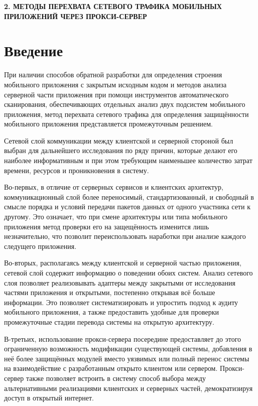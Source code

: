 \newpage
\begin{center}
  \textbf{\large 2. МЕТОДЫ ПЕРЕХВАТА СЕТЕВОГО ТРАФИКА МОБИЛЬНЫХ ПРИЛОЖЕНИЙ ЧЕРЕЗ ПРОКСИ-СЕРВЕР}
\end{center}


\section{Введение}

При наличии способов обратной разработки для определения строения мобильного приложения с закрытым исходным кодом и методов анализа серверной части приложения при помощи инструментов автоматического сканирования, обеспечивающих отдельных анализ двух подсистем мобильного приложения, метод перехвата сетевого трафика для определения защищённости мобильного приложения представляется промежуточным решением.

Сетевой слой коммуникации между клиентской и серверной стороной был выбран для дальнейшего исследования по ряду причин, которые делают его наиболее информативным и при этом требующим наименьшее количество затрат времени, ресурсов и проникновения в систему.

Во-первых, в отличие от серверных сервисов и клиентских архитектур, коммуникационный слой более переносимый, стандартизованный, и свободный в смысле порядка и условий передачи пакетов данных от одного участника сети к другому. Это означает, что при смене архитектуры или типа мобильного приложения метод проверки его на защещённость изменится лишь незначительно, что позволит переиспользовать наработки при анализе каждого следущего приложения.

Во-вторых, располагаясь между клиентской и серверной частью приложения, сетевой слой содержит информацию о поведении обоих систем. Анализ сетевого слоя позволяет реализовывать адаптеры между закрытыми от исследования частями приложения и открытыми, постепенно открывая всё больше информации. Это позволяет систематизировать и упростить подход к аудиту мобильного приложения, а также предоставить удобные для проверки промежуточные стадии перевода системы на открытую архитектуру.

В-третьих, использование прокси-сервера посередине предоставляет до этого ограниченную возможность модификации существующей системы, добавления в неё более защищённых модулей вместо уязвимых или полный перенос системы на взаимодействие с разработанным открыто клиентом или сервером. Прокси-сервер также позволяет встроить в систему способ выбора между альтернативными реализациями клиентских и серверных частей, демократизируя доступ в открытый интернет.

